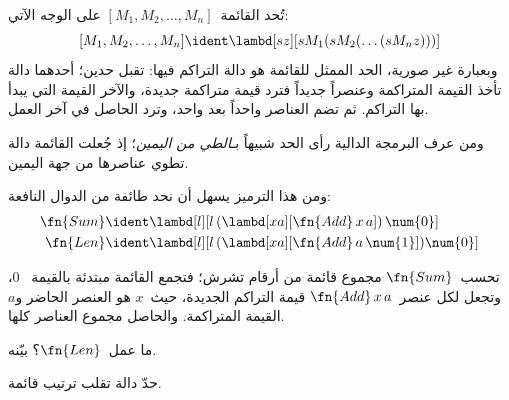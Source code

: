 \documentclass[../../../include/open-logic-section]{subfiles}
\begin{document}

تُحد القائمة~$[M_1, M_2, \ldots, M_n]$ على الوجه الآتي:
\[
  [M_1, M_2, \ldots, M_n] \ident \lambd[sz][s M_1 (s M_2 (\ldots (s M_n z)))]
\]
وبعبارة غير صورية، الحد الممثل للقائمة هو دالة التراكم فيها: تقبل حدين؛ أحدهما
دالة تأخذ القيمة المتراكمة وعنصراً جديداً فترد قيمة متراكمة جديدة، والآخر
القيمة التي يبدأ بها التراكم. ثم تضم العناصر واحداً بعد واحد، وترد الحاصل
في آخر العمل.

\begin{digress}
  ومن عرف البرمجة الدالية رأى الحد شبيهاً بـ\emph{الطي من اليمين}؛ إذ
  جُعلت القائمة دالة تطوي عناصرها من جهة اليمين.
\end{digress}

ومن هذا الترميز يسهل أن نحد طائفة من الدوال النافعة:
\begin{align*}
  \fn{Sum} & \ident
  \lambd[l][l \, (\lambd[xa][\fn{Add} \, x \, a])\,  \num{0}]\\
  \fn{Len} & \ident
  \lambd[l][l \, (\lambd[xa][\fn{Add} \, a \, \num{1}]) \num{0}]
\end{align*}

تحسب~$\fn{Sum}$ مجموع قائمة من أرقام تشرش؛ فتجمع القائمة مبتدئة بالقيمة
~$\num{0}$، وتجعل لكل عنصر~$\fn{Add} \, x\, a$ قيمة التراكم الجديدة،
حيث~$x$ هو العنصر الحاضر و$a$ القيمة المتراكمة. والحاصل مجموع العناصر
كلها.

\begin{prob}
  ما عمل~$\fn{Len}$؟ بيّنه.
\end{prob}

\begin{prob}
  حدّ دالة تقلب ترتيب قائمة.
\end{prob}
\end{document}

